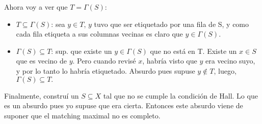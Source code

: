 \documentclass[11pt]{article}
\begin{document}
Ahora voy a ver que \(T = \Gamma(S)\):
\begin{itemize}
\item \(T \subseteq \Gamma(S)\): sea \(y \in T\), \(y\) tuvo que ser etiquetado por una fila de S, y como cada fila etiqueta a sus columnas vecinas es claro que \({y \in \Gamma(S).}\)
\item \(\Gamma(S) \subseteq T\): sup. que existe un \(y \in \Gamma(S)\) que no está en T. Existe un \({x \in S}\) que es vecino de \(y\). Pero cuando revisé \(x\), habría visto que \(y\) era vecino suyo, y por lo tanto lo habría etiquetado. Absurdo pues supuse \({y \not\in T}\), luego, \({\Gamma(S) \subseteq T.}\)
\end{itemize}

Finalmente, construí un \(S \subseteq X\) tal que no se cumple la condición de Hall. Lo que es un absurdo pues yo supuse que era cierta. Entonces este absurdo viene de suponer que el matching maximal no es completo.
\end{document}
